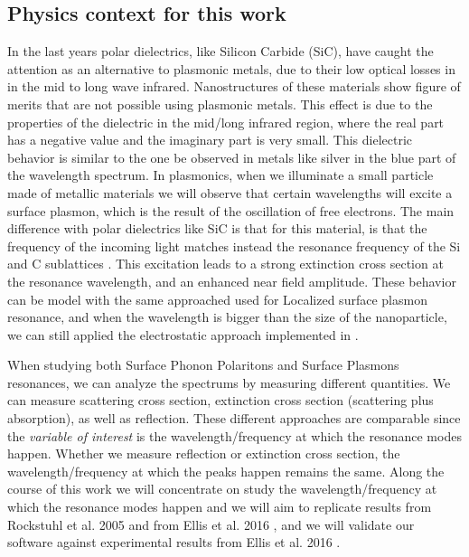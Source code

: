 \subsection{Physics context for this work}

In the last years polar dielectrics, like Silicon Carbide (SiC), have caught the attention as an alternative to plasmonic metals, due to their low optical losses in in the
mid to long wave infrared. Nanostructures of these materials show figure of merits that are not possible using plasmonic metals. This effect is due to the properties 
of the dielectric in the mid/long infrared region, where the real part has a negative value and the imaginary part is very small. This dielectric behavior is similar to the one 
be observed in metals like silver in the blue part of the wavelength spectrum. 
In plasmonics, when we illuminate a small particle made of metallic materials we will observe that certain wavelengths will excite a surface plasmon, which is the result of 
the oscillation of free electrons. The main difference with polar dielectrics like SiC is that for this material, is that the frequency of the incoming light matches instead the
resonance frequency of the Si and C sublattices \cite{caldwell2015,rockstuhl2005}. This excitation leads to a strong extinction cross section at the resonance wavelength, and an 
enhanced near field amplitude. These behavior can be model  with the same approached used for Localized surface plasmon resonance, and when the wavelength is bigger than the size
of the nanoparticle, we can still applied the electrostatic approach implemented in \pygbe \cite{ClementiETal2017, ClementiETal2019}.

When studying both Surface Phonon Polaritons and Surface Plasmons resonances, we can analyze the spectrums by measuring different quantities. We can measure scattering cross section, extinction cross section 
(scattering plus absorption), as well as reflection. These different approaches are comparable since the \textit{variable of interest} is the wavelength/frequency at which 
the resonance modes happen. Whether we measure reflection or extinction cross section, the wavelength/frequency at which the peaks happen remains the same. Along the course of this 
work we will concentrate on study the wavelength/frequency at which the resonance modes happen and we will aim to replicate results from Rockstuhl et al. 2005 \cite{rockstuhl2005} and 
from Ellis et al. 2016 \cite{ellis2016}, and we will validate our software against experimental results from Ellis et al. 2016 \cite{ellis2016}.
